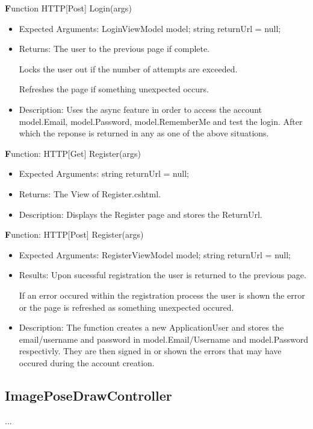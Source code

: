 \documentclass{scrreprt}
\begin{document}
  \textbf Function HTTP[Post] Login(args)
  \begin{itemize}
    \item Expected Arguments:
    LoginViewModel model;
    string returnUrl = null;
    \item Returns:
    The user to the previous page if complete.

    Locks the user out if the number of attempts are exceeded.

    Refreshes the page if something unexpected occurs.
    \item Description:
    Uses the async feature in order to access the account model.Email, model.Password, model.RememberMe and test the login. After which the reponse is returned in any as one of the above situations.
  \end{itemize}

  \textbf Function: HTTP[Get] Register(args)
  \begin{itemize}
    \item Expected Arguments:
    string returnUrl = null;
    \item Returns:
    The View of Register.cshtml.
    \item Description:
    Displays the Register page and stores the ReturnUrl.
  \end{itemize}

  \textbf Function: HTTP[Post] Register(args)
  \begin{itemize}
    \item Expected Arguments:
    RegisterViewModel model;
    string returnUrl = null;
    \item Results:
    Upon sucessful registration the user is returned to the previous page.

    If an error occured within the registration process the user is shown the error or the page is refreshed as something unexpected occured.
    \item Description:
    The function creates a new ApplicationUser and stores the email/username and password in model.Email/Username and model.Password respectivly. They are then signed in or shown the errors that may have occured during the account creation.
  \end{itemize}


\subsection{ImagePoseDrawController}

...
\end{document}
